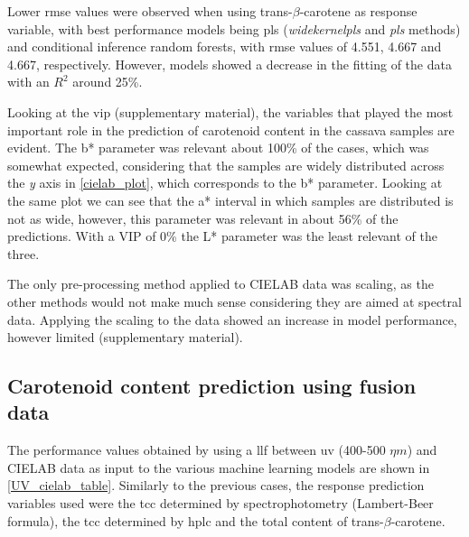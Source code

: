 Lower \gls{rmse} values were observed when using trans-$\beta$-carotene as response variable, with best performance models being \gls{pls} (\textit{widekernelpls} and \textit{pls} methods) and conditional inference random forests, with \gls{rmse} values of 4.551, 4.667 and 4.667, respectively. However, models showed a decrease in the fitting of the data with an $R^{2}$ around 25\%.

Looking at the \gls{vip} (supplementary material), the variables that played the most important role in the prediction of carotenoid content in the cassava samples are evident. The b* parameter was relevant about 100\% of the cases, which was somewhat expected, considering that the samples are widely distributed across the \textit{y} axis in \autoref{cielab_plot}, which corresponds to the b* parameter. Looking at the same plot we can see that the a* interval in which samples are distributed is not as wide, however, this parameter was relevant in about 56\% of the predictions. With a VIP of 0\% the L* parameter was the least relevant of the three.

The only pre-processing method applied to CIELAB data was scaling, as the other methods would not make much sense considering they are aimed at spectral data. Applying the scaling to the data showed an increase in model performance, however limited (supplementary material).



\subsection{Carotenoid content prediction using fusion data} \label{ml_fusion_subsec}

The performance values obtained by using a \gls{llf} between \gls{uv} (400-500 $\eta m$) and CIELAB data as input to the various machine learning models are shown in \autoref{UV_cielab_table}. Similarly to the previous cases, the response prediction variables used were the \gls{tcc} determined by spectrophotometry (Lambert-Beer formula), the \gls{tcc} determined by \gls{hplc} and the total content of trans-$\beta$-carotene.


